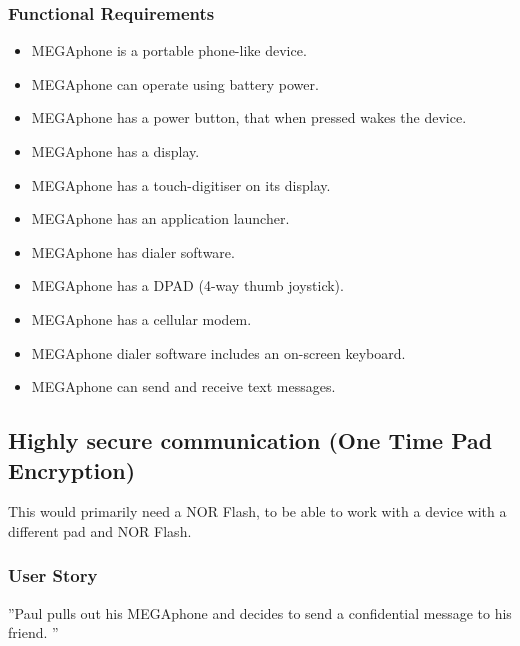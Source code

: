         \subsubsection{Functional Requirements}
        \begin{itemize}
        \item MEGAphone is a portable phone-like device.
        \item MEGAphone can operate using battery power.
        \item MEGAphone has a power button, that when pressed wakes the device.
        \item MEGAphone has a display.
        \item MEGAphone has a touch-digitiser on its display.
        \item MEGAphone has an application launcher.
        \item MEGAphone has dialer software.
        \item MEGAphone has a DPAD (4-way thumb joystick).
        \item MEGAphone has a cellular modem.
	\item MEGAphone dialer software includes an on-screen keyboard.
	\item MEGAphone can send and receive text messages.
        \end{itemize}

\subsection{Highly secure communication (One Time Pad Encryption)}
	This would primarily need a NOR Flash, to be able to work with a device with a different pad and NOR Flash.\\

	\subsubsection{User Story}
	''Paul pulls out his MEGAphone and decides to send a confidential message to his friend. ''

